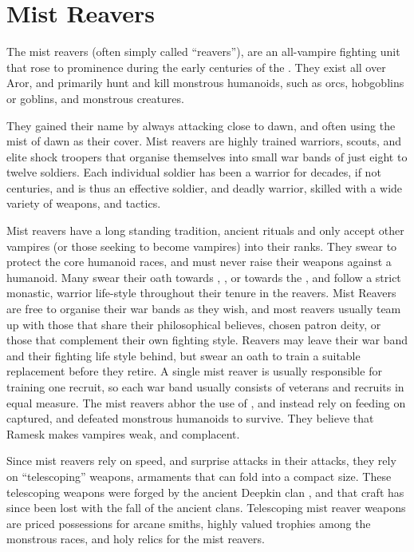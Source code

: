 \section{Mist Reavers}
\label{sec:Mist Reavers}

The mist reavers (often simply called ``reavers''), are an all-vampire
fighting unit that rose to prominence during the early centuries of the
. They exist all over Aror, and primarily hunt and kill
monstrous humanoids, such as orcs, hobgoblins or goblins, and monstrous
creatures.

They gained their name by always attacking close to dawn, and often using
the mist of dawn as their cover. Mist reavers are highly trained warriors,
scouts, and elite shock troopers that organise themselves into small war
bands of just eight to twelve soldiers. Each individual soldier has been
a warrior for decades, if not centuries, and is thus an effective soldier,
and deadly warrior, skilled with a wide variety of weapons, and tactics.

Mist reavers have a long standing tradition, ancient rituals and only accept
other vampires (or those seeking to become vampires) into their ranks. They
swear to protect the core humanoid races, and must never raise their weapons
against a humanoid. Many swear their oath towards ,
, or towards the , and
follow a strict monastic, warrior life-style throughout their tenure in the
reavers. Mist Reavers are free to organise their war bands as they wish,
and most reavers usually team up with those that share their philosophical
believes, chosen patron deity, or those that complement their own fighting
style. Reavers may leave their war band and their fighting life style behind,
but swear an oath to train a suitable replacement before they retire. A single
mist reaver is usually responsible for training one recruit, so each war band
usually consists of veterans and recruits in equal measure. The mist reavers
abhor the use of , and instead rely on feeding on
captured, and defeated monstrous humanoids to survive. They believe that
Ramesk makes vampires weak, and complacent.

Since mist reavers rely on speed, and surprise attacks in their attacks, they
rely on ``telescoping'' weapons, armaments that can fold into a compact
size. These telescoping weapons were forged by the ancient Deepkin clan
, and that craft has since been lost with the fall of
the ancient clans. Telescoping mist reaver weapons are priced possessions
for arcane smiths, highly valued trophies among the monstrous races, and
holy relics for the mist reavers.

